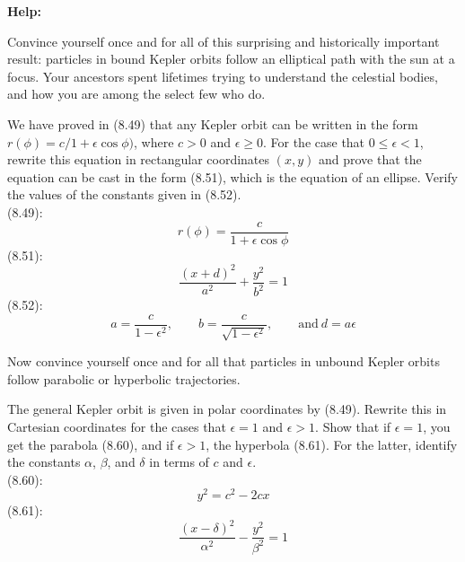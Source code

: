 \documentclass[11pt,letterpaper,boxed]{../hmcpsetrhino}
\begin{document}
\textbf{Help:} 

\begin{problem}[i]
Convince yourself once and for all of this surprising and historically important result: particles in bound Kepler orbits follow an elliptical path with the sun at a focus. Your ancestors spent lifetimes trying to understand the celestial bodies, and how you are among the select few who do.
\begin{problem}[8.16]
We have proved in (8.49) that any Kepler orbit can be written in the form $r(\phi) = c/1 + \epsilon \cos \phi)$, where $c>0$ and $\epsilon \geq 0$. For the case that $0 \leq \epsilon <1$, rewrite this equation in rectangular coordinates $(x,y)$ and prove that the equation can be cast in the form (8.51), which is the equation of an ellipse. Verify the values of the constants given in (8.52).\\
(8.49):
\[	r(\phi) = \frac{c}{1 + \epsilon \cos \phi}\]
(8.51):
\[	\frac{(x+d)^2}{a^2} + \frac{y^2}{b^2} = 1\]
(8.52): 
\[	a = \frac{c}{1 - \epsilon^2}, \qquad b = \frac{c}{\sqrt{1 - \epsilon^2}}, \qquad \text{and} \  d = a \epsilon\]
\end{problem}
\vspace{-0.45cm}
\end{problem}
\begin{solution}


\vfill
\end{solution}

\newpage 

\begin{problem}[ii]
Now convince yourself once and for all that particles in unbound Kepler orbits follow parabolic or hyperbolic trajectories.\\
\begin{problem}[8.30]
The general Kepler orbit is given in polar coordinates by (8.49). Rewrite this in Cartesian coordinates for the cases that $\epsilon = 1$ and $\epsilon > 1$. Show that if $\epsilon = 1$, you get the parabola (8.60), and if $\epsilon >1$, the hyperbola (8.61). For the latter, identify the constants $\alpha$, $\beta$, and $\delta$ in terms of $c$ and $\epsilon$.\\

(8.60):
\[	y^2 =c^2 - 2cx\]
(8.61):
\[	\frac{(x-\delta)^2}{\alpha^2} - \frac{y^2}{\beta^2} = 1\]
\end{problem}
\vspace{-0.45cm}
\end{problem}
\begin{solution}


\vfill
\end{solution}
\end{document}
